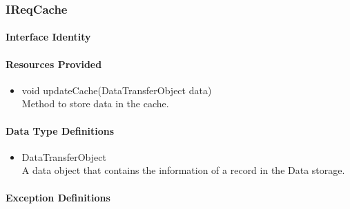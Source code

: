 \subsubsection{IReqCache}
\paragraph{Interface Identity}
\paragraph{Resources Provided}
\begin{itemize}
	\item{void updateCache(DataTransferObject data)}\\
	Method to store data in the cache.
\end{itemize}
\paragraph{Data Type Definitions}
\begin{itemize}
	\item DataTransferObject\\
	A data object that contains the information of a record in the Data storage.
\end{itemize}
\paragraph{Exception Definitions}
